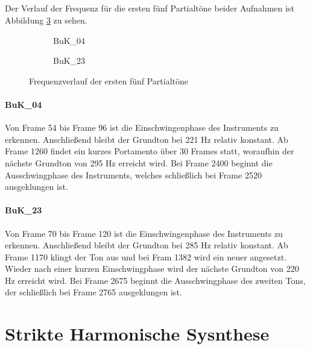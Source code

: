 \subsection{}
Der Verlauf der Frequenz für die ersten fünf Partialtöne beider Aufnahmen ist Abbildung \ref{fig:freq} zu sehen.

\begin{figure}[H]
    \centering
    \begin{subfigure}{.5\textwidth}
        \centering
        \caption{BuK\_04}
        \scalebox{0.5}{}
        \label{fig:sub1}
    \end{subfigure}%
    \begin{subfigure}{.5\textwidth}
        \centering
        \caption{BuK\_23}
        \scalebox{0.5}{}
        \label{fig:sub2}
    \end{subfigure}
    \caption{Frequenzverlauf der ersten fünf Partialtöne}
    \label{fig:freq}
\end{figure}

\paragraph{BuK\_04}
Von Frame 54 bis Frame 96 ist die Einschwingenphase des Instruments zu erkennen.
Anschließend bleibt der Grundton bei 221 Hz relativ konstant.
Ab Frame 1260 findet ein kurzes Portamento über 30 Frames statt, woraufhin der nächste Grundton von 295 Hz erreicht wird.
Bei Frame 2400 beginnt die Ausschwingphase des Instruments, welches schließlich bei Frame 2520 ausgeklungen ist.

\paragraph{BuK\_23}
Von Frame 70 bis Frame 120 ist die Einschwingenphase des Instruments zu erkennen.
Anschließend bleibt der Grundton bei 285 Hz relativ konstant.
Ab Frame 1170 klingt der Ton aus und bei Fram 1382 wird ein neuer angesetzt.
Wieder nach einer kurzen Einschwingphase wird der nächste Grundton von 220 Hz erreicht wird.
Bei Frame 2675 beginnt die Ausschwingphase des zweiten Tons, der schließlich bei Frame 2765 ausgeklungen ist.


\section{Strikte Harmonische Sysnthese}
\label{sec:2}

